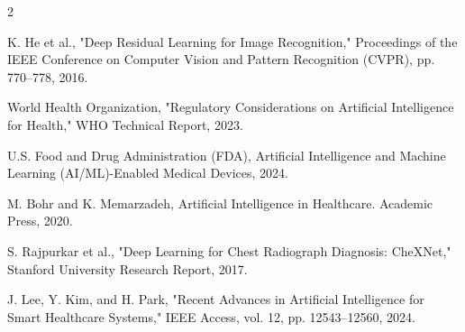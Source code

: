 \begin{multicols}{2}
{\begin{justify}
\begin{enumerate}[
  label={[\arabic*]},
  leftmargin=*,
  labelsep=0.5em,
  itemsep=0.20em,
  parsep=0pt,
  topsep=0.15em
]
  \item K. He et al., "Deep Residual Learning for Image Recognition," Proceedings of the IEEE Conference on Computer Vision and Pattern Recognition (CVPR), pp. 770--778, 2016.
  \item World Health Organization, "Regulatory Considerations on Artificial Intelligence for Health," WHO Technical Report, 2023.
  \item U.S. Food and Drug Administration (FDA), Artificial Intelligence and Machine Learning (AI/ML)-Enabled Medical Devices, 2024.
  \item M. Bohr and K. Memarzadeh, Artificial Intelligence in Healthcare. Academic Press, 2020.
  \item S. Rajpurkar et al., "Deep Learning for Chest Radiograph Diagnosis: CheXNet," Stanford University Research Report, 2017.
  \item J. Lee, Y. Kim, and H. Park, "Recent Advances in Artificial Intelligence for Smart Healthcare Systems," IEEE Access, vol. 12, pp. 12543--12560, 2024.
\end{enumerate}
\end{justify}
}


\end{multicols}